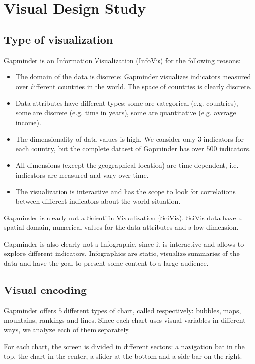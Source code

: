 \section{Visual Design Study}
\label{sec:visual_design}

\subsection{Type of visualization}
Gapminder is an Information Visualization (InfoVis) for the following reasons:
\begin{itemize}
    \item The domain of the data is discrete: Gapminder visualizes indicators measured over different countries in the world. The space of countries is clearly discrete.
    \item Data attributes have different types: some are categorical (e.g. countries), some are discrete (e.g. time in years), some are quantitative (e.g. average income). 
    \item The dimensionality of data values is high. We consider only $3$ indicators for each country, but the complete dataset of Gapminder has over $500$ indicators.
    \item All dimensions (except the geographical location) are time dependent, i.e. indicators are measured and vary over time.
    \item The visualization is interactive and has the scope to look for correlations between different indicators about the world situation.
\end{itemize}

Gapminder is clearly not a Scientific Visualization (SciVis).
SciVis data have a spatial domain, numerical values for the data attributes and a low dimension.

Gapminder is also clearly not a Infographic, since it is interactive and allows to explore different indicators.
Infographics are static, visualize summaries of the data and have the goal to present some content to a large audience.

\subsection{Visual encoding}
Gapminder offers $5$ different types of chart, called respectively: bubbles, maps, mountains, rankings and lines.
Since each chart uses visual variables in different ways, we analyze each of them separately.

For each chart, the screen is divided in different sectors:
a navigation bar in the top, the chart in the center, a slider at the bottom and a side bar on the right.

